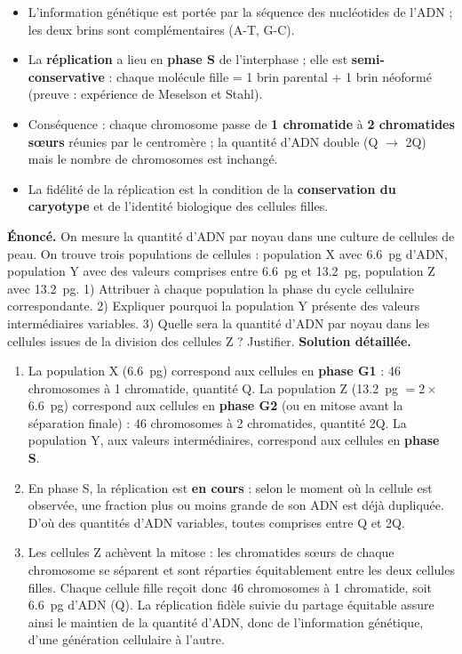\documentclass[11pt]{article}
\begin{document}
\begin{aretenir}
\begin{itemize}
\item L'information génétique est portée par la séquence des nucléotides de l'ADN ; les deux brins sont complémentaires (A-T, G-C).
\item La \textbf{réplication} a lieu en \textbf{phase S} de l'interphase ; elle est \textbf{semi-conservative} : chaque molécule fille = 1 brin parental + 1 brin néoformé (preuve : expérience de Meselson et Stahl).
\item Conséquence : chaque chromosome passe de \textbf{1 chromatide} à \textbf{2 chromatides sœurs} réunies par le centromère ; la quantité d'ADN double (Q $\rightarrow$ 2Q) mais le nombre de chromosomes est inchangé.
\item La fidélité de la réplication est la condition de la \textbf{conservation du caryotype} et de l'identité biologique des cellules filles.
\end{itemize}
\end{aretenir}

\begin{exoresolu}
\textbf{Énoncé.} On mesure la quantité d'ADN par noyau dans une culture de cellules de peau. On trouve trois populations de cellules : population X avec \SI{6,6}{pg} d'ADN, population Y avec des valeurs comprises entre \SI{6,6}{pg} et \SI{13,2}{pg}, population Z avec \SI{13,2}{pg}. 1) Attribuer à chaque population la phase du cycle cellulaire correspondante. 2) Expliquer pourquoi la population Y présente des valeurs intermédiaires variables. 3) Quelle sera la quantité d'ADN par noyau dans les cellules issues de la division des cellules Z ? Justifier.
\tcblower
\textbf{Solution détaillée.}
\begin{enumerate}
\item La population X (\SI{6,6}{pg}) correspond aux cellules en \textbf{phase G1} : 46 chromosomes à 1 chromatide, quantité Q. La population Z (\SI{13,2}{pg} $= 2 \times$ \SI{6,6}{pg}) correspond aux cellules en \textbf{phase G2} (ou en mitose avant la séparation finale) : 46 chromosomes à 2 chromatides, quantité 2Q. La population Y, aux valeurs intermédiaires, correspond aux cellules en \textbf{phase S}.
\item En phase S, la réplication est \textbf{en cours} : selon le moment où la cellule est observée, une fraction plus ou moins grande de son ADN est déjà dupliquée. D'où des quantités d'ADN variables, toutes comprises entre Q et 2Q.
\item Les cellules Z achèvent la mitose : les chromatides sœurs de chaque chromosome se séparent et sont réparties équitablement entre les deux cellules filles. Chaque cellule fille reçoit donc 46 chromosomes à 1 chromatide, soit \SI{6,6}{pg} d'ADN (Q). La réplication fidèle suivie du partage équitable assure ainsi le maintien de la quantité d'ADN, donc de l'information génétique, d'une génération cellulaire à l'autre.
\end{enumerate}
\end{exoresolu}
\end{document}
